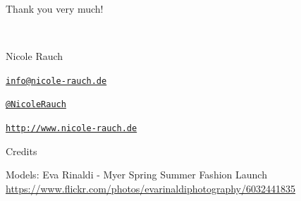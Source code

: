 \begin{frame}{Thank you very much!}

  ~\\[1em]
  \begin{block}{Nicole Rauch}
    \begin{description}[Twitterxx]
    \item[E-Mail]  \href{mailto:info@nicole-rauch.de}{\texttt{info@nicole-rauch.de}}
    \item[Twitter] \href{http://twitter.com/NicoleRauch}{\texttt{@NicoleRauch}}
    \item[Web] \href{http://www.nicole-rauch.de}{\texttt{http://www.nicole-rauch.de}}
    \end{description}
  \end{block}
\end{frame}


\begin{frame}{Credits}

Models: Eva Rinaldi - Myer Spring Summer Fashion Launch \\
{\footnotesize \url{https://www.flickr.com/photos/evarinaldiphotography/6032441835}}


{\footnotesize \url{}}
{\footnotesize \url{}}
{\footnotesize \url{}}

\end{frame}
